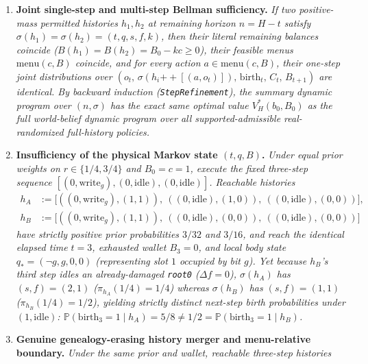 \documentclass[11pt,a4paper]{article}
\providecommand{\tightlist}{\setlength{\itemsep}{2pt}\setlength{\parskip}{0pt}}
\begin{document}
\begin{enumerate}
\def\labelenumi{\arabic{enumi}.}
\tightlist
\item
  \textbf{Joint single-step and multi-step Bellman sufficiency.}
  \emph{If two positive-mass permitted histories \(h_1, h_2\) at
  remaining horizon \(n = H - t\) satisfy
  \(\sigma(h_1) = \sigma(h_2) = (t, q, s, f, k)\), then their literal
  remaining balances coincide (\(B(h_1) = B(h_2) = B_0 - kc \ge 0\)),
  their feasible menus \(\mathrm{menu}(c, B)\) coincide, and for every
  action \(a \in \mathrm{menu}(c, B)\), their one-step joint
  distributions over
  \((o_t,\, \sigma(h_i \mathbin{+\!+} [(a, o_t)]),\, \mathrm{birth}_t,\, C_t,\, B_{t+1})\)
  are identical. By backward induction (\texttt{StepRefinement}), the
  summary dynamic program over \((n, \sigma)\) has the exact same
  optimal value \(V_H^*(b_0, B_0)\) as the full world-belief dynamic
  program over all supported-admissible real-randomized full-history
  policies.}
\item
  \textbf{Insufficiency of the physical Markov state \((t, q, B)\).}
  \emph{Under equal prior weights on \(r \in \{1/4, 3/4\}\) and
  \(B_0 = c = 1\), execute the fixed three-step sequence
  \([(0, \mathrm{write}_g), (0, \mathrm{idle}), (0, \mathrm{idle})]\).
  Reachable histories} \[\begin{aligned}
  h_A &:= \bigl[((0,\mathrm{write}_g),(1,1)),\ ((0,\mathrm{idle}),(1,0)),\ ((0,\mathrm{idle}),(0,0))\bigr], \\
  h_B &:= \bigl[((0,\mathrm{write}_g),(1,1)),\ ((0,\mathrm{idle}),(0,0)),\ ((0,\mathrm{idle}),(0,0))\bigr]
  \end{aligned}\] \emph{have strictly positive prior probabilities
  \(3/32\) and \(3/16\), and reach the identical elapsed time \(t = 3\),
  exhausted wallet \(B_3 = 0\), and local body state
  \(q_* = (\neg g, g, 0, 0)\) (representing slot \(1\) occupied by bit
  \(g\)). Yet because \(h_B\)'s third step idles an already-damaged
  \texttt{root0} (\(\Delta f = 0\)), \(\sigma(h_A)\) has
  \((s,f) = (2,1)\) (\(\pi_{h_A}(1/4) = 1/4\)) whereas \(\sigma(h_B)\)
  has \((s,f) = (1,1)\) (\(\pi_{h_B}(1/4) = 1/2\)), yielding strictly
  distinct next-step birth probabilities under \((1, \mathrm{idle})\):
  \(\mathbb{P}(\mathrm{birth}_3 = 1 \mid h_A) = 5/8 \neq 1/2 = \mathbb{P}(\mathrm{birth}_3 = 1 \mid h_B)\).}
\item
  \textbf{Genuine genealogy-erasing history merger and menu-relative
  boundary.} \emph{Under the same prior and wallet, reachable three-step
  histories} \[\begin{aligned}

\end{aligned}\]
\end{enumerate}
\end{document}
